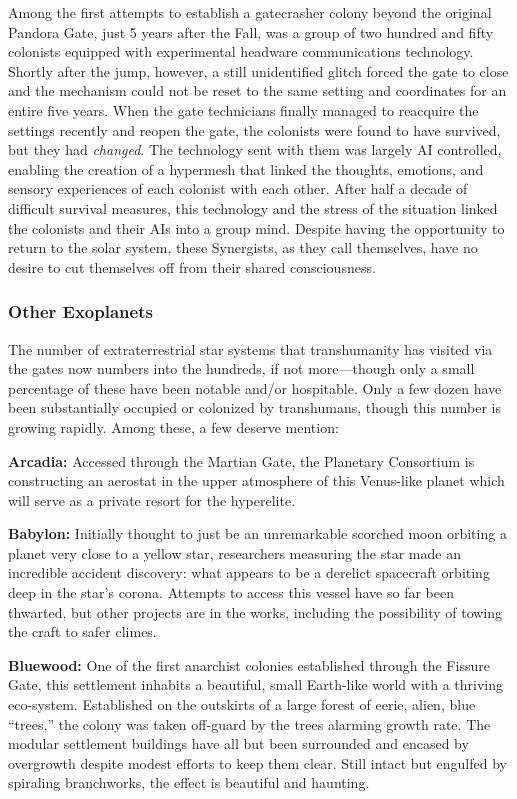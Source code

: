 Among the first attempts to establish a gatecrasher 
colony beyond the original Pandora Gate, just 5 years 
after the Fall, was a group of two hundred and fifty 
colonists equipped with experimental headware communications technology. Shortly after the jump, however, a still unidentified glitch forced the gate to close 
and the mechanism could not be reset to the same setting and coordinates for an entire five years. When the 
gate technicians finally managed to reacquire the settings recently and reopen the gate, the colonists were 
found to have survived, but they had \textit{changed}. The 
technology sent with them was largely AI controlled, 
enabling the creation of a hypermesh that linked the 
thoughts, emotions, and sensory experiences of each 
colonist with each other. After half a decade of difficult survival measures, this technology and the stress 
of the situation linked the colonists and their AIs into 
a group mind. Despite having the opportunity to 
return to the solar system, these Synergists, as they 
call themselves, have no desire to cut themselves off 
from their shared consciousness.

\subsubsection{Other Exoplanets}

The number of extraterrestrial star systems that transhumanity has visited via the gates now numbers into 
the hundreds, if not more—though only a small percentage of these have been notable and/or hospitable. 
Only a few dozen have been substantially occupied 
or colonized by transhumans, though this number is 
growing rapidly. Among these, a few deserve mention:

\textbf{Arcadia:} Accessed through the Martian Gate, the 
Planetary Consortium is constructing an aerostat in 
the upper atmosphere of this Venus-like planet which 
will serve as a private resort for the hyperelite.

\textbf{Babylon:} Initially thought to just be an unremarkable scorched moon orbiting a planet very close to a 
yellow star, researchers measuring the star made an 
incredible accident discovery: what appears to be a 
derelict spacecraft orbiting deep in the star's corona. 
Attempts to access this vessel have so far been thwarted, but other projects are in the works, including the 
possibility of towing the craft to safer climes.

\textbf{Bluewood:} One of the first anarchist colonies established through the Fissure Gate, this settlement 
inhabits a beautiful, small Earth-like world with a 
thriving eco-system. Established on the outskirts of 
a large forest of eerie, alien, blue ``trees,'' the colony 
was taken off-guard by the trees alarming growth 
rate. The modular settlement buildings have all but 
been surrounded and encased by overgrowth despite 
modest efforts to keep them clear. Still intact but engulfed by spiraling branchworks, the effect is beautiful 
and haunting.

